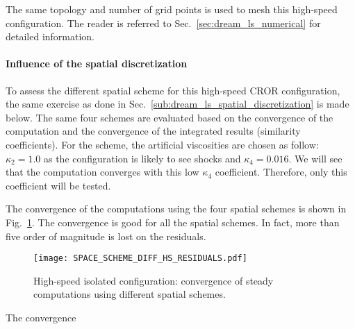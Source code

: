 
The same topology and number of grid points is used to
mesh this high-speed configuration. The reader is referred to 
Sec.~\ref{sec:dream_ls_numerical} for detailed information.

\paragraph{Influence of the spatial discretization}
\label{sub:dream_hs_spatial_discretization}

To assess the different spatial scheme for this high-speed
CROR configuration, the same exercise as done in 
Sec.~\ref{sub:dream_ls_spatial_discretization} is made below.
The same four schemes are evaluated based 
on the convergence of the computation
and the convergence of the integrated 
results (similarity coefficients).
For the \citet{Jameson1981} scheme, the artificial viscosities
are chosen as follow: $\kappa_2 = 1.0$ as the configuration is likely to 
see shocks and $\kappa_4 = 0.016$. We will see that the computation converges
with this low $\kappa_4$ coefficient. Therefore, only this coefficient
will be tested.

The convergence of the computations using the four spatial schemes
is shown in Fig.~\ref{fig:DREAM_HS_RESIDUALS_PPT}. The convergence is good
for all the spatial schemes. In fact, more than five order of magnitude
is lost on the residuals.
\begin{figure}[htb]
  \centering
  \texttt{[image: SPACE\_SCHEME\_DIFF\_HS\_RESIDUALS.pdf]}
  \caption{High-speed isolated configuration: convergence 
  of steady computations using different spatial schemes.}
  \label{fig:DREAM_HS_RESIDUALS_PPT}
\end{figure}
The convergence 

